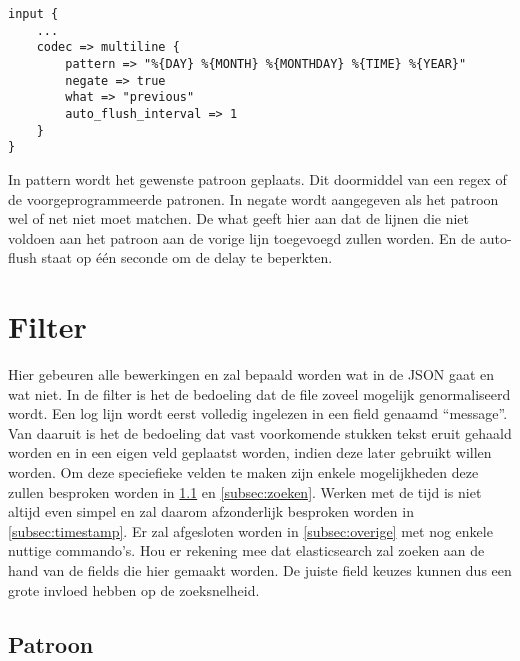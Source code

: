 \lstset{escapechar=@,style=customc}  
\begin{lstlisting}[frame=single]  
input {
	...
	codec => multiline {
		pattern => "%{DAY} %{MONTH} %{MONTHDAY} %{TIME} %{YEAR}"
		negate => true
		what => "previous"
		auto_flush_interval => 1
	}
}
\end{lstlisting}

In pattern wordt het gewenste patroon geplaats. Dit doormiddel van een regex of de voorgeprogrammeerde patronen.  In negate wordt aangegeven als het patroon wel of net niet moet matchen. De what geeft hier aan dat de lijnen die niet voldoen aan het patroon aan de vorige lijn toegevoegd zullen worden. En de auto-flush staat op één seconde om de delay te beperkten.


\section{Filter}
\label{sec:filter}

Hier gebeuren alle bewerkingen en zal bepaald worden wat in de JSON gaat en wat niet. In de filter is het de bedoeling dat de file zoveel mogelijk genormaliseerd wordt. Een log lijn wordt eerst volledig ingelezen in een field  genaamd “message”. Van daaruit is het de bedoeling dat vast voorkomende stukken tekst eruit gehaald worden en in een eigen veld geplaatst worden, indien deze later gebruikt willen worden.  Om deze speciefieke velden te maken zijn enkele mogelijkheden deze zullen besproken worden in \hyperref[subsec:patroon]{\ref{subsec:patroon}} en \hyperref[subsec:zoeken]{\ref{subsec:zoeken}}. Werken met de tijd is niet altijd even simpel en zal daarom afzonderlijk besproken worden in \hyperref[subsec:timestamp]{\ref{subsec:timestamp}}. Er zal afgesloten worden in \hyperref[subsec:overige]{\ref{subsec:overige}} met nog enkele nuttige commando’s. 
Hou er rekening mee dat elasticsearch zal zoeken aan de hand van de fields die hier gemaakt worden. De juiste field keuzes kunnen dus een grote invloed hebben op de zoeksnelheid.


\subsection{Patroon}
\label{subsec:patroon}

